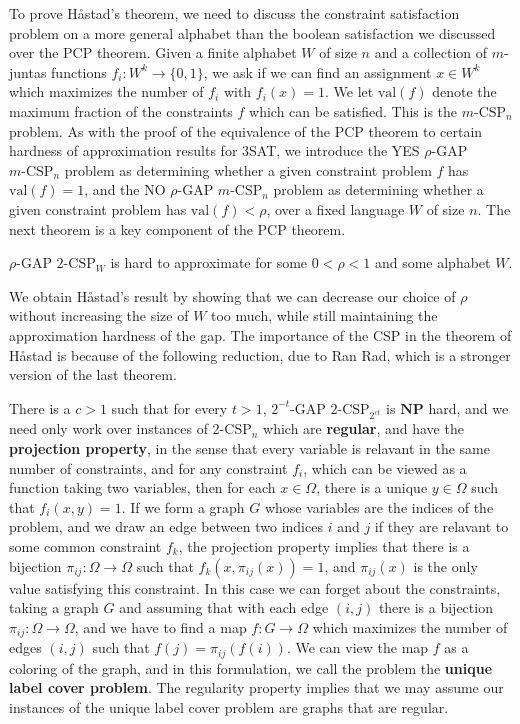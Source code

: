 To prove Håstad's theorem, we need to discuss the constraint satisfaction problem on a more general alphabet than the boolean satisfaction we discussed over the PCP theorem. Given a finite alphabet $W$ of size $n$ and a collection of $m$-juntas functions $f_i: W^k \to \{ 0, 1 \}$, we ask if we can find an assignment $x \in W^k$ which maximizes the number of $f_i$ with $f_i(x) = 1$.  We let $\text{val}(f)$ denote the maximum fraction of the constraints $f$ which can be satisfied. This is the $m\text{-CSP}_n$ problem. As with the proof of the equivalence of the PCP theorem to certain hardness of approximation results for 3SAT, we introduce the YES $\rho$-GAP $m\text{-CSP}_n$ problem as determining whether a given constraint problem $f$ has $\text{val}(f) = 1$, and the NO $\rho$-GAP $m\text{-CSP}_n$ problem as determining whether a given constraint problem has $\text{val}(f) < \rho$, over a fixed language $W$ of size $n$. The next theorem is a key component of the PCP theorem.

\begin{theorem}
    $\rho$-GAP $2\text{-CSP}_W$ is hard to approximate for some $0 < \rho < 1$ and some alphabet $W$.
\end{theorem}

We obtain Håstad's result by showing that we can decrease our choice of $\rho$ without increasing the size of $W$ too much, while still maintaining the approximation hardness of the gap. The importance of the CSP in the theorem of Håstad is because of the following reduction, due to Ran Rad, which is a stronger version of the last theorem.

\begin{theorem}
    There is a $c > 1$ such that for every $t > 1$, $2^{-t}$-GAP $2\text{-CSP}_{2^{ct}}$ is $\mathbf{NP}$ hard, and we need only work over instances of $2\text{-CSP}_n$ which are {\bf regular}, and have the {\bf projection property}, in the sense that every variable is relavant in the same number of constraints, and for any constraint $f_i$, which can be viewed as a function taking two variables, then for each $x \in \Omega$, there is a unique $y \in \Omega$ such that $f_i(x,y) = 1$. If we form a graph $G$ whose variables are the indices of the problem, and we draw an edge between two indices $i$ and $j$ if they are relavant to some common constraint $f_k$, the projection property implies that there is a bijection $\pi_{ij}: \Omega \to \Omega$ such that $f_k(x, \pi_{ij}(x)) = 1$, and $\pi_{ij}(x)$ is the only value satisfying this constraint. In this case we can forget about the constraints, taking a graph $G$ and assuming that with each edge $(i,j)$ there is a bijection $\pi_{ij}: \Omega \to \Omega$, and we have to find a map $f: G \to \Omega$ which maximizes the number of edges $(i,j)$ such that $f(j) = \pi_{ij}(f(i))$. We can view the map $f$ as a coloring of the graph, and in this formulation, we call the problem the {\bf unique label cover problem}. The regularity property implies that we may assume our instances of the unique label cover problem are graphs that are regular.
\end{theorem}

